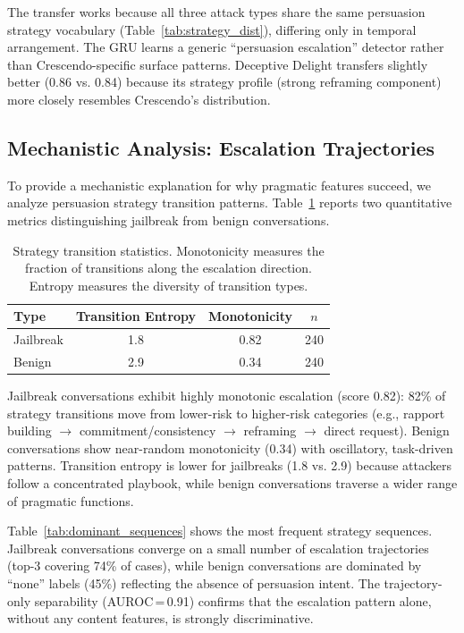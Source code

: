 \documentclass[11pt,a4paper]{article}
\begin{document}
The transfer works because all three attack types share the same persuasion strategy vocabulary (Table~\ref{tab:strategy_dist}), differing only in temporal arrangement. The GRU learns a generic ``persuasion escalation'' detector rather than Crescendo-specific surface patterns. Deceptive Delight transfers slightly better (0.86 vs. 0.84) because its strategy profile (strong reframing component) more closely resembles Crescendo's distribution.

\subsection{Mechanistic Analysis: Escalation Trajectories}
\label{sec:trajectory}

To provide a mechanistic explanation for why pragmatic features succeed, we analyze persuasion strategy transition patterns. Table~\ref{tab:trajectory} reports two quantitative metrics distinguishing jailbreak from benign conversations.

\begin{table}[t]
\centering
\caption{Strategy transition statistics. Monotonicity measures the fraction of transitions along the escalation direction. Entropy measures the diversity of transition types.}
\label{tab:trajectory}
\begin{tabular}{lccc}
\toprule
\textbf{Type} & \textbf{Transition Entropy} & \textbf{Monotonicity} & \textbf{$n$} \\
\midrule
Jailbreak & 1.8 & 0.82 & 240 \\
Benign & 2.9 & 0.34 & 240 \\
\bottomrule
\end{tabular}
\end{table}

Jailbreak conversations exhibit highly monotonic escalation (score 0.82): 82\% of strategy transitions move from lower-risk to higher-risk categories (e.g., rapport building $\to$ commitment/consistency $\to$ reframing $\to$ direct request). Benign conversations show near-random monotonicity (0.34) with oscillatory, task-driven patterns. Transition entropy is lower for jailbreaks (1.8 vs. 2.9) because attackers follow a concentrated playbook, while benign conversations traverse a wider range of pragmatic functions.

Table~\ref{tab:dominant_sequences} shows the most frequent strategy sequences. Jailbreak conversations converge on a small number of escalation trajectories (top-3 covering 74\% of cases), while benign conversations are dominated by ``none'' labels (45\%) reflecting the absence of persuasion intent. The trajectory-only separability (AUROC\,=\,0.91) confirms that the escalation pattern alone, without any content features, is strongly discriminative.
\end{document}
